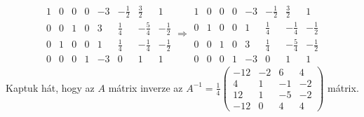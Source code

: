 \documentclass[9pt, showtrims]{memoir}
\theoremstyle{plain}
\theoremstyle{remark}
\theoremstyle{definition}
\begin{document}
\begin{multline*}
    \begin{array}{cccc|cccc}
        1&0&0&0 & -3&-\frac{1}{2}&\frac{3}{2}&1\\
        0&0&1&0 & 3&\frac{1}{4}&-\frac{5}{4}&-\frac{1}{2}\\
        0&1&0&0 & 1&\frac{1}{4}&-\frac{1}{4}&-\frac{1}{2}\\
        0&0&0&1 & -3&0&1&1
    \end{array}\Rightarrow
    \begin{array}{cccc|cccc}
        1&0&0&0 & -3&-\frac{1}{2}&\frac{3}{2}&1\\
        0&1&0&0 & 1&\frac{1}{4}&-\frac{1}{4}&-\frac{1}{2}\\
        0&0&1&0 & 3&\frac{1}{4}&-\frac{5}{4}&-\frac{1}{2}\\
        0&0&0&1 & -3&0&1&1
    \end{array}
\end{multline*}
Kaptuk hát, hogy az $A$ mátrix inverze az
\begin{math}
    A^{-1}=\frac{1}{4}
    \begin{pmatrix}
        -12&-2&6&4\\
        4&1&-1&-2\\
        12&1&-5&-2\\
        -12&0&4&4
    \end{pmatrix}
\end{math}
mátrix.
\end{document}
